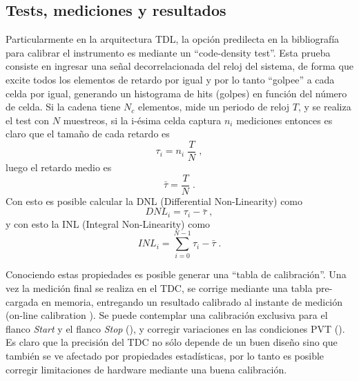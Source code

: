 \subsection{Tests, mediciones y resultados}
Particularmente en la arquitectura TDL, la opción predilecta en la bibliografía para calibrar el instrumento es mediante 
un ``code-density test''. Esta prueba consiste en ingresar una señal decorrelacionada del reloj del sistema, de forma que 
excite todos los elementos de retardo por igual y por lo tanto ``golpee'' a cada celda por igual, generando un
histograma de hits (golpes) en función del número de celda. Si la cadena tiene
$N_c$ elementos, mide un periodo de reloj $T$, y se realiza el test con $N$ muestreos,
si la i-ésima celda captura $n_i$ mediciones entonces es claro que el 
tamaño de cada retardo es
\begin{equation}
     \tau_i = n_i \; \dfrac{T}{N} \; ,
     \label{eq: tau_i}
\end{equation}
luego el retardo medio es
\begin{equation}
     \bar{\tau} = \dfrac{T}{N} \; .
     \label{eq: tau_medio}
\end{equation}
Con esto es posible calcular la DNL (Differential Non-Linearity) como
\begin{equation}
     DNL_i = \tau_i - \bar{\tau} \; ,
     \label{eq: DNL}
\end{equation}
y con esto la INL (Integral Non-Linearity) como
\begin{equation}
     INL_i = \sum_{i=0}^{N-1} {\tau_i - \bar{\tau}} \; .
     \label{eq: INL}
\end{equation}

Conociendo estas propiedades es posible generar una ``tabla de calibración''. Una vez la medición final
se realiza en el TDC, se corrige mediante una tabla pre-cargada en memoria, entregando un resultado
calibrado al instante de medición (on-line calibration \cite{Liu2015}). Se puede contemplar
una calibración exclusiva para el flanco \textit{Start} y el flanco \textit{Stop} (\cite{Khaddour2023}), y 
corregir variaciones en las condiciones PVT (\cite{Qin2017}).
Es claro que la precisión del TDC no sólo depende de un buen diseño sino que también 
se ve afectado por propiedades estadísticas, por lo tanto es posible corregir limitaciones de
hardware mediante una buena calibración.\\


